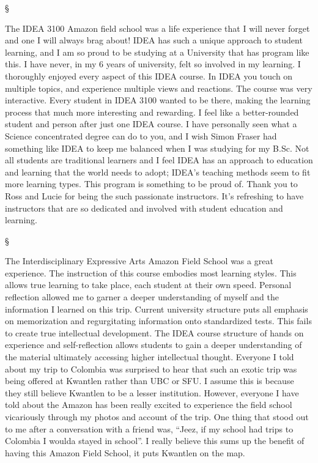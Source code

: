 \documentclass[letterpaper,10pt,headsepline]{scrreprt}
\begin{document}
\begin{center}§\end{center}

The IDEA 3100 Amazon field school was a life experience that I will
never forget and one I will always brag about! IDEA has such a unique
approach to student learning, and I am so proud to be studying at a
University that has program like this. I have never, in my 6 years of
university, felt so involved in my learning. I thoroughly enjoyed every
aspect of this IDEA course. In IDEA you touch on multiple topics, and
experience multiple views and reactions. The course was very
interactive. Every student in IDEA 3100 wanted to be there, making the
learning process that much more interesting and rewarding. I feel like a
better-rounded student and person after just one IDEA course. I have
personally seen what a Science concentrated degree can do to you, and I
wish Simon Fraser had something like IDEA to keep me balanced when I was
studying for my B.Sc. Not all students are traditional learners and I
feel IDEA has an approach to education and learning that the world needs
to adopt; IDEA's teaching methods seem to fit more learning types. This
program is something to be proud of. Thank you to Ross and Lucie for
being the such passionate instructors. It's refreshing to have
instructors that are so dedicated and involved with student education
and learning.

\begin{center}§\end{center}

The Interdisciplinary Expressive Arts Amazon Field School was a great
experience. The instruction of this course embodies most learning
styles. This allows true learning to take place, each student at their
own speed. Personal reflection allowed me to garner a deeper
understanding of myself and the information I learned on this trip.
Current university structure puts all emphasis on memorization and
regurgitating information onto standardized tests. This fails to create
true intellectual development. The IDEA course structure of hands on
experience and self-reflection allows students to gain a deeper
understanding of the material ultimately accessing higher intellectual
thought. Everyone I told about my trip to Colombia was surprised to hear
that such an exotic trip was being offered at Kwantlen rather than UBC
or SFU. I assume this is because they still believe Kwantlen to be a
lesser institution. However, everyone I have told about the Amazon has
been really excited to experience the field school vicariously through
my photos and account of the trip. One thing that stood out to me after
a conversation with a friend was, ``Jeez, if my school had trips to
Colombia I woulda stayed in school''. I really believe this sums up the
benefit of having this Amazon Field School, it puts Kwantlen on the map.
\end{document}
